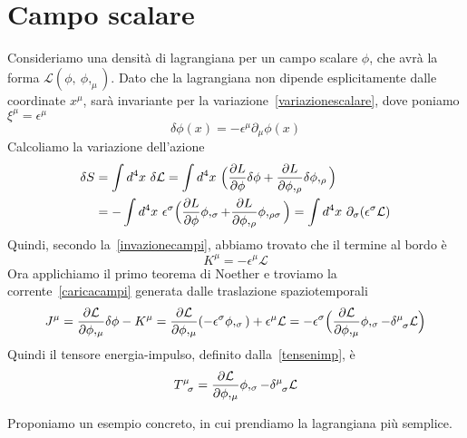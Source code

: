 \section{Campo scalare}
    Consideriamo una densità di lagrangiana per un campo scalare $\phi$, che avrà la forma $\mathcal L(\phi,~\phi,_\mu)$. Dato che la lagrangiana non dipende esplicitamente dalle coordinate $x^\mu$, sarà invariante per la variazione~\eqref{variazionescalare}, dove poniamo $\xi^\mu = \epsilon^\mu$
    \begin{equation}
        \delta \phi(x) = - \epsilon^\mu \partial_\mu \phi(x)
    \end{equation}
    Calcoliamo la variazione dell'azione
    \begin{equation*}
    \begin{aligned}
        \delta S & = \int d^4 x ~ \delta \mathcal L = \int d^4 x ~ \Big ( \frac{\partial L}{\partial\phi} \delta \phi + \frac{\partial L}{\partial\phi,_\rho} \delta \phi,_\rho \Big) \\ & = - \int d^4 x ~ \epsilon^\sigma \Big ( \frac{\partial L}{\partial\phi} \phi,_\sigma + \frac{\partial L}{\partial\phi,_\rho} \phi,_{\rho\sigma} \Big) = \int d^4 x ~ \partial_\sigma (\epsilon^\sigma \mathcal L)
    \end{aligned}
    \end{equation*}
    Quindi, secondo la~\eqref{invazionecampi}, abbiamo trovato che il termine al bordo è
    \begin{equation*}
        K^\mu = - \epsilon^\mu \mathcal L
    \end{equation*}
    Ora applichiamo il primo teorema di Noether e troviamo la corrente~\eqref{caricacampi} generata dalle traslazione spaziotemporali
    \begin{equation*}
        J^\mu = \pdv{\mathcal L}{\phi,_\mu} \delta \phi - K^\mu = \pdv{\mathcal L}{\phi,_\mu} (- \epsilon^\sigma \phi,_\sigma) + \epsilon^\mu \mathcal L = - \epsilon^\sigma \Big ( \pdv{\mathcal L}{\phi,_\mu} \phi,_\sigma - \delta^\mu_{\phantom \mu \sigma} \mathcal L \Big)
    \end{equation*}
    Quindi il tensore energia-impulso, definito dalla~\eqref{tensenimp}, è
    \begin{equation}
        T^\mu_{\phantom \mu \sigma} = \pdv{\mathcal L}{\phi,_\mu} \phi,_\sigma - \delta^\mu_{\phantom \mu \sigma} \mathcal L
    \end{equation}

    \hfill

    Proponiamo un esempio concreto, in cui prendiamo la lagrangiana più semplice.

